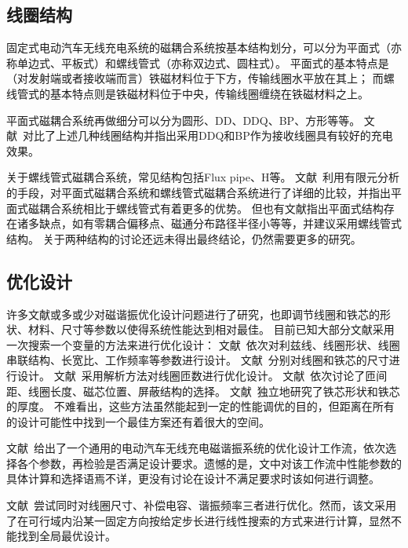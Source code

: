 \documentclass[index]{subfiles}
\begin{document}
\subsection{线圈结构}
固定式电动汽车无线充电系统的磁耦合系统按基本结构划分，可以分为平面式（亦称单边式、平板式）和螺线管式（亦称双边式、圆柱式）\cite{高大威2015}。
平面式的基本特点是（对发射端或者接收端而言）铁磁材料位于下方，传输线圈水平放在其上；
而螺线管式的基本特点则是铁磁材料位于中央，传输线圈缠绕在铁磁材料之上。

平面式磁耦合系统再做细分可以分为圆形\cite{budhia2011}、DD\cite{budhia2013}、DDQ\cite{budhia2013}、BP\cite{covic2011}、方形\cite{choi2014}等等。
文献~对比了上述几种线圈结构并指出采用DDQ和BP作为接收线圈具有较好的充电效果。

关于螺线管式磁耦合系统，常见结构包括Flux pipe\cite{budhia2010}、H\cite{takanashi2012}等。
文献~利用有限元分析的手段，对平面式磁耦合系统和螺线管式磁耦合系统进行了详细的比较，并指出平面式磁耦合系统相比于螺线管式有着更多的优势。
但也有文献\cite{唐云宇2015}指出平面式结构存在诸多缺点，如有零耦合偏移点、磁通分布路径半径小等等，并建议采用螺线管式结构。
关于两种结构的讨论还远未得出最终结论，仍然需要更多的研究。

\subsection{优化设计}
许多文献或多或少对磁谐振优化设计问题进行了研究，也即调节线圈和铁芯的形状、材料、尺寸等参数以使得系统性能达到相对最佳。
目前已知大部分文献采用一次搜索一个变量的方法来进行优化设计：
文献~依次对利兹线、线圈形状、线圈串联结构、长宽比、工作频率等参数进行设计。
文献~分别对线圈和铁芯的尺寸进行设计。
文献~采用解析方法对线圈匝数进行优化设计。
文献~依次讨论了匝间距、线圈长度、磁芯位置、屏蔽结构的选择。
文献~独立地研究了铁芯形状和铁芯的厚度。
不难看出，这些方法虽然能起到一定的性能调优的目的，但距离在所有的设计可能性中找到一个最佳方案还有着很大的空间。

文献~给出了一个通用的电动汽车无线充电磁谐振系统的优化设计工作流，依次选择各个参数，再检验是否满足设计要求。遗憾的是，文中对该工作流中性能参数的具体计算和选择语焉不详，更没有讨论在设计不满足要求时该如何进行调整。

文献~尝试同时对线圈尺寸、补偿电容、谐振频率三者进行优化。然而，该文采用了在可行域内沿某一固定方向按给定步长进行线性搜索的方式来进行计算，显然不能找到全局最优设计。
\end{document}
